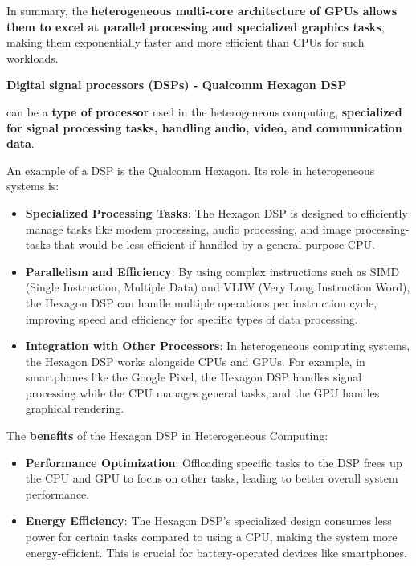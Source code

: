 \highspace
In summary, the \textbf{heterogeneous multi-core architecture of GPUs allows them to excel at parallel processing and specialized graphics tasks}, making them exponentially faster and more efficient than CPUs for such workloads.

\newpage

\begin{flushleft}
    \textcolor{Green3}{ \textbf{Digital signal processors (DSPs) - Qualcomm Hexagon DSP}}
\end{flushleft}
 can be a \textbf{type of processor} used in the heterogeneous computing, \textbf{specialized for signal processing tasks, handling audio, video, and communication data}.

\highspace
\begin{examplebox}
    An example of a DSP is the Qualcomm Hexagon. Its role in heterogeneous systems is:
    \begin{itemize}
        \item \textbf{Specialized Processing Tasks}: The Hexagon DSP is designed to efficiently manage tasks like modem processing, audio processing, and image processing-tasks that would be less efficient if handled by a general-purpose CPU.
        \item \textbf{Parallelism and Efficiency}: By using complex instructions such as SIMD (Single Instruction, Multiple Data) and VLIW (Very Long Instruction Word), the Hexagon DSP can handle multiple operations per instruction cycle, improving speed and efficiency for specific types of data processing.
        \item \textbf{Integration with Other Processors}: In heterogeneous computing systems, the Hexagon DSP works alongside CPUs and GPUs. For example, in smartphones like the Google Pixel, the Hexagon DSP handles signal processing while the CPU manages general tasks, and the GPU handles graphical rendering.
    \end{itemize}
    The \textbf{benefits} of the Hexagon DSP in Heterogeneous Computing:
    \begin{itemize}[label=\textcolor{Green3}{}]
        \item \textcolor{Green3}{\textbf{Performance Optimization}}: Offloading specific tasks to the DSP frees up the CPU and GPU to focus on other tasks, leading to better overall system performance.
        \item \textcolor{Green3}{\textbf{Energy Efficiency}}: The Hexagon DSP's specialized design consumes less power for certain tasks compared to using a CPU, making the system more energy-efficient. This is crucial for battery-operated devices like smartphones.

\end{itemize}
\end{examplebox}
